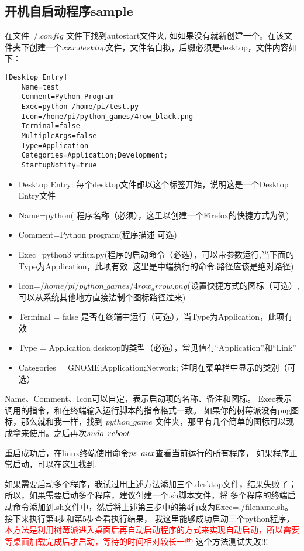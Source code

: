 \subsection{开机自启动程序sample}
在文件 $~/.config$ 文件下找到autostart文件夹, 如如果没有就新创建一个。在该文件夹下创建一个$xxx.desktop$文件，文件名自拟，后缀必须是desktop，文件内容如下：
\begin{lstlisting}[title=xxx.desktop]
    [Desktop Entry]
    Name=test
    Comment=Python Program
    Exec=python /home/pi/test.py
    Icon=/home/pi/python_games/4row_black.png
    Terminal=false
    MultipleArgs=false
    Type=Application
    Categories=Application;Development;
    StartupNotify=true
\end{lstlisting}

\begin{itemize}
    \item  Desktop Entry: 每个desktop文件都以这个标签开始，说明这是一个Desktop Entry文件
    \item  Name=python( 程序名称（必须），这里以创建一个Firefox的快捷方式为例)
    \item  Comment=Python program(程序描述 可选)
    \item  Exec=python3 wifitz.py(程序的启动命令（必选），可以带参数运行,当下面的Type为Application，此项有效. 这里是中端执行的命令,路径应该是绝对路径)
    \item  Icon=$/home/pi/python\_games/4row_arrow.png$(设置快捷方式的图标（可选）,可以从系统其他地方直接法制个图标路径过来)
    \item  Terminal = false 是否在终端中运行（可选），当Type为Application，此项有效
    \item  Type = Application desktop的类型（必选），常见值有“Application”和“Link”
    \item  Categories = GNOME;Application;Network; 注明在菜单栏中显示的类别（可选）
\end{itemize}
Name、Comment、Icon可以自定，表示启动项的名称、备注和图标。
Exec表示调用的指令，和在终端输入运行脚本的指令格式一致。
如果你的树莓派没有png图标，那么就和我一样，找到 $python\_game$ 文件夹，那里有几个简单的图标可以现成拿来使用。之后再次$sudo \hspace{0.5em} reboot$

重启成功后，在linux终端使用命令\textcolor{red}{$ps \hspace{0.5em} aux$}查看当前运行的所有程序，
如果程序正常启动，可以在这里找到.

\par 如果需要启动多个程序，我试过用上述方法添加三个.desktop文件，结果失败了；
所以，如果需要启动多个程序，建议创建一个.sh脚本文件，将
多个程序的终端启动命令添加到.sh文件中，然后将上述第三步中的第4行改为Exec=./filename.sh。接下来执行第4步和第5步查看执行结果，
我这里能够成功启动三个python程序，
\textcolor{red}{本方法是利用树莓派进入桌面后再自动启动程序的方式来实现自动启动，所以需要等桌面加载完成后才启动，等待的时间相对较长一些}
这个方法测试失败!!!